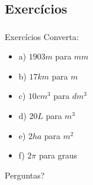 \documentclass{beamer}
\begin{document}
\subsection{Exercícios}
\begin{frame}\frametitle{\subsecname}
    \begin{block}{Exercícios}
        Converta:
        \begin{itemize}
            \item a) $1903m$ para $mm$
            \item b) $17km$ para $m$
            \item c) $10cm^3$ para $dm^3$
            \item d) $20L$ para $m^3$
            \item e) $2ha$ para $m^2$
            \item f) $2\pi$ para graus
        \end{itemize}
    \end{block}
\end{frame}


\begin{frame}
    \Huge{\centerline{Perguntas?}}
\end{frame}

\end{document}
